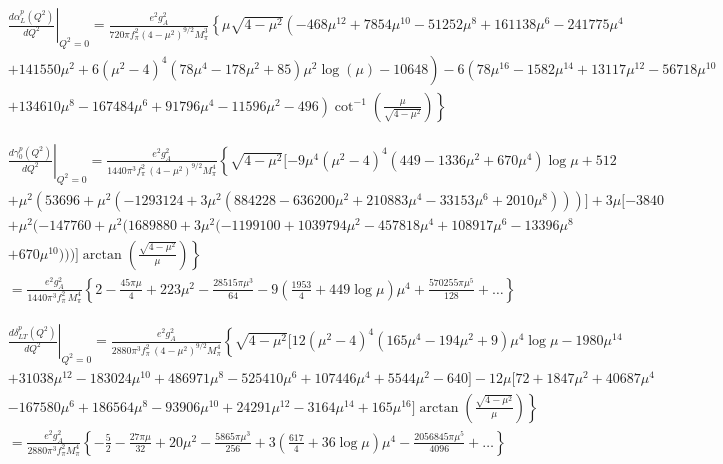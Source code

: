 \documentclass[prc,twocolumn,showpacs,preprintnumbers,amsmath,amssymb
,superscriptaddress,a4paper,nofootinbib
]{revtex4-1}
\begin{document}
\begin{widetext}
\begin{align}
&\left.\frac{d\alpha_{L}^p (Q^2)}{dQ^2}\right|_{Q^2=0}= \frac{e^2 g_A^2}{720 \pi f_\pi^2 (4-\mu^2)^{9/2} M_\pi^3}\left\{\mu  \sqrt{4-\mu ^2} \left(-468 \mu ^{12}+7854 \mu ^{10}-51252 \mu ^8+161138 \mu ^6-241775 \mu ^4 \right. \right. \nonumber\\
&\left. +141550 \mu ^2+6 \left(\mu ^2-4\right)^4
   \left(78 \mu ^4-178 \mu ^2+85\right) \mu ^2 \log (\mu )-10648\right)-6 \left(78 \mu ^{16}-1582 \mu ^{14}+13117 \mu ^{12}-56718 \mu
   ^{10} \right. \nonumber \\
 & \left. \left.+134610 \mu ^8-167484 \mu ^6+91796 \mu ^4-11596 \mu ^2-496\right) \cot ^{-1}\left(\frac{\mu }{\sqrt{4-\mu ^2}}\right)\right\}
\end{align}


\begin{align}
&\left.\frac{d\gamma_0^p (Q^2)}{dQ^2}\right|_{Q^2=0}=\frac{e^2 g_A^2}{1440 \pi^3 f_\pi^2\,  (4-\mu^2)^{9/2} M_\pi^4}\left\{  \sqrt{4-\mu^2}[-9\mu^4(\mu^2-4)^4 (449-1336\mu^2+670\mu^4)\log\mu+512 \right.\nonumber \\
&+\mu^2(53696+\mu^2(-1293124+3\mu^2 (884228-636200 \mu^2+210883\mu^4-33153\mu^6 +2010 \mu^8 )))] +3\mu [-3840 \nonumber \\
&+\mu^2 (-147760+\mu^2 (1689880+3\mu^2( -1199100+1039794\mu^2-457818\mu^4+108917 \mu^6-13396\mu^8 \nonumber \\ 
&\left.+670 \mu^{10}))) ]\arctan\left( \frac{\sqrt{4-\mu^2}}{\mu}\right)   \right\} \nonumber \\
&= \frac{e^2 g_A^2}{1440 \pi^3 f_\pi^2\, M_\pi^4} \left\{ 2 - \frac{45 \pi \mu}{4} + 223 \mu^2 - \frac{28515 \pi \mu^3 }{64} - 9 \left( \frac{1953}{4} + 449 \log\mu\right)\mu^4 + \frac{570255 \pi \mu^5}{128} + \dots   \right\} 
\end{align}


\begin{align}
&\left.\frac{d\delta_{LT}^p (Q^2)}{dQ^2}\right|_{Q^2=0}=\frac{e^2 g_A^2}{2880 \pi^3 f_\pi^2\,  (4-\mu^2)^{9/2} M_\pi^4}\left\{ \sqrt{4-\mu^2}[12 (\mu^2-4)^4 (165 \mu^4 -194 \mu^2 +9) \mu^4 \log\mu-1980 \mu^{14} \right.  \nonumber \\
&+31038 \mu^{12}-183024 \mu^{10} +486971 \mu^8 -525410 \mu^6 + 107446 \mu^4 +5544 \mu^2 -640] -12 \mu [72 + 1847 \mu^2 +40687 \mu^4 \nonumber \\
&\left. -167580 \mu^6+186564 \mu^8 -93906 \mu^{10} +24291 \mu^{12} -3164 \mu^{14}+165 \mu^{16}]\arctan\left( \frac{\sqrt{4-\mu^2}}{\mu} \right)   \right\} \nonumber \\
&= \frac{e^2 g_A^2}{2880 \pi^3 f_\pi^2 M_\pi^4} \left\{  -\frac{5}{2} - \frac{27 \pi \mu}{32} + 20 \mu^2 - \frac{5865 \pi \mu^3}{256} +  3\left( \frac{617}{4} + 36 \log\mu \right)\mu^4 - \frac{2056845 \pi \mu^5}{4096} +\dots \right\}
\end{align}



\end{widetext}
\end{document}
